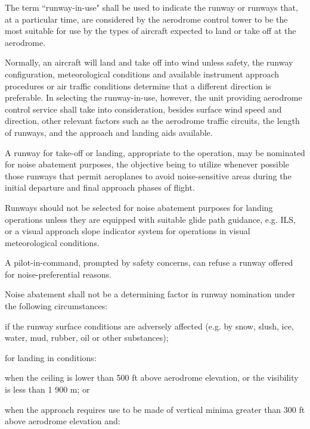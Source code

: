 \begin{enumnoss}
    \item The term ``runway-in-use" shall be used to indicate the runway or runways that, at a particular time, are considered by the aerodrome control tower to be the most suitable for use by the types of aircraft expected to land or take off at the aerodrome.
    \item Normally, an aircraft will land and take off into wind unless safety, the runway configuration, meteorological conditions and available instrument approach procedures or air traffic conditions determine that a different direction is preferable. In selecting the runway-in-use, however, the unit providing aerodrome control service shall take into consideration, besides surface wind speed and direction, other relevant factors such as the aerodrome traffic circuits, the length of runways, and the approach and landing aids available.
    \item A runway for take-off or landing, appropriate to the operation, may be nominated for noise abatement purposes, the objective being to utilize whenever possible those runways that permit aeroplanes to avoid noise-sensitive areas during the initial departure and final approach phases of flight.
    \item Runways should not be selected for noise abatement purposes for landing operations unless they are equipped with suitable glide path guidance, e.g. ILS, or a visual approach slope indicator system for operations in visual meteorological conditions.
    \item A pilot-in-command, prompted by safety concerns, can refuse a runway offered for noise-pref\-er\-en\-tial reasons.
    \item Noise abatement shall not be a determining factor in runway nomination under the following circumstances:

    \begin{enumalph}
        \item if the runway surface conditions are adversely affected (e.g. by snow, slush, ice, water, mud, rubber, oil or other substances);
        \item for landing in conditions:

        \begin{enumarab}
            \item when the ceiling is lower than 500 ft above aerodrome elevation, or the visibility is less than 1 900 m; or
            \item when the approach requires use to be made of vertical minima greater than 300 ft above aerodrome elevation and:


\end{enumarab}
\end{enumalph}
\end{enumnoss}
